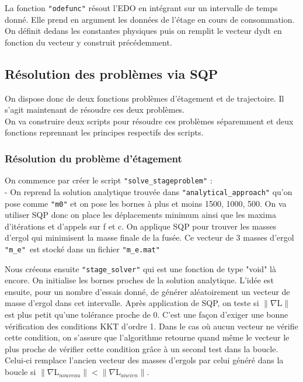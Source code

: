 La fonction \texttt{"odefunc"} résout l'EDO en intégrant sur un intervalle de temps donné. Elle prend en argument les données de l'étage en cours de consommation. On définit dedans les constantes physiques puis on remplit le vecteur dydt en fonction du vecteur y construit précédemment.\medbreak

\subsection{Résolution des problèmes via SQP}\medbreak
On dispose donc de deux fonctions problèmes d'étagement et de trajectoire. Il s'agit maintenant de résoudre ces deux problèmes.\\
On va construire deux scripts pour résoudre ces problèmes séparemment et deux fonctions reprennant les principes respectifs des scripts.\medbreak


\subsubsection{Résolution du problème d'étagement}\medbreak

On commence par créer le script \texttt{"solve\_stageproblem"} : \\
\indent - On reprend la solution analytique trouvée dans \texttt{"analytical\_approach"} qu'on pose comme \texttt{"m0"} et on pose les bornes à plus et moins 1500, 1000, 500. On va utiliser SQP donc on place les déplacements minimum ainsi que les maxima d'itérations et d'appels sur f et c. On applique SQP pour trouver les masses d'ergol qui minimisent la masse finale de la fusée. Ce vecteur de 3 masses d'ergol \texttt{"m\_e" }est stocké dans un fichier \texttt{"m\_e.mat"}\medbreak

Nous créeons ensuite \texttt{"stage\_solver"} qui est une fonction de type "void" là encore. On initialise les bornes proches de la solution analytique. L'idée est ensuite, pour un nombre d'essais donné, de générer aléatoirement un vecteur de masse d'ergol dans cet intervalle. Après application de SQP, on teste si $\|    \nabla $L$   \|$ est plus petit qu'une tolérance proche de 0. C'est une façon d'exiger une bonne vérification des conditions KKT d'ordre 1. Dans le cas où aucun vecteur ne vérifie cette condition, on s'assure que l'algorithme retourne quand même le vecteur le plus proche de vérifier cette condition grâce à un second test dans la boucle. Celui-ci remplace l'ancien vecteur des masses d'ergols par celui généré dans la boucle si $\|    \nabla $L$_{nouveau}   \| < \|    \nabla $L$_{ancien}   \|$.\medbreak


